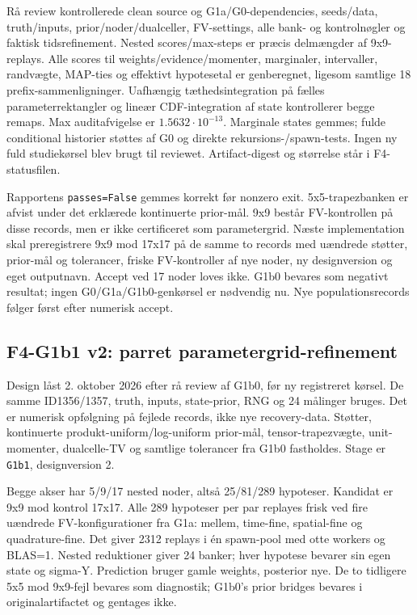 Rå review kontrollerede clean source og G1a/G0-dependencies, seeds/data,
truth/inputs, prior/noder/dualceller, FV-settings, alle bank- og kontrolnøgler
og faktisk tidsrefinement. Nested scores/max-steps er præcis delmængder af
9x9-replays. Alle scores til weights/evidence/momenter, marginaler, intervaller,
randvægte, MAP-ties og effektivt hypotesetal er genberegnet, ligesom samtlige
18 prefix-sammenligninger. Uafhængig tæthedsintegration på fælles
parameterrektangler og lineær CDF-integration af state kontrollerer begge remaps.
Max auditafvigelse er \(1.5632\cdot10^{-13}\). Marginale states gemmes;
fulde conditional historier støttes af G0 og direkte rekursions-/spawn-tests.
Ingen ny fuld studiekørsel blev brugt til reviewet. Artifact-digest og størrelse
står i F4-statusfilen.

Rapportens \texttt{passes=False} gemmes korrekt før nonzero exit.
5x5-trapezbanken er afvist under det erklærede kontinuerte prior-mål.
9x9 består FV-kontrollen på disse records, men er ikke certificeret som
parametergrid. Næste implementation skal preregistrere 9x9 mod 17x17 på de samme
to records med uændrede støtter, prior-mål og tolerancer, friske FV-kontroller
af nye noder, ny designversion og eget outputnavn. Accept ved 17 noder loves ikke.
G1b0 bevares som negativt resultat; ingen G0/G1a/G1b0-genkørsel er nødvendig nu.
Nye populationsrecords følger først efter numerisk accept.

\subsection{F4-G1b1 v2: parret parametergrid-refinement}
Design låst 2. oktober 2026 efter rå review af G1b0, før ny registreret kørsel.
De samme ID1356/1357, truth, inputs, state-prior, RNG og 24 målinger bruges.
Det er numerisk opfølgning på fejlede records, ikke nye recovery-data.
Støtter, kontinuerte produkt-uniform/log-uniform prior-mål, tensor-trapezvægte,
unit-momenter, dualcelle-TV og samtlige tolerancer fra G1b0 fastholdes.
Stage er \texttt{G1b1}, designversion 2.

Begge akser har 5/9/17 nested noder, altså 25/81/289 hypoteser.
Kandidat er 9x9 mod kontrol 17x17. Alle 289 hypoteser per par replayes frisk
ved fire uændrede FV-konfigurationer fra G1a: mellem, time-fine, spatial-fine
og quadrature-fine. Det giver 2312 replays i én spawn-pool med otte workers
og BLAS=1. Nested reduktioner giver 24 banker; hver hypotese bevarer sin egen
state og sigma-Y. Prediction bruger gamle weights, posterior nye.
De to tidligere 5x5 mod 9x9-fejl bevares som diagnostik; G1b0's prior bridges
bevares i originalartifactet og gentages ikke.

